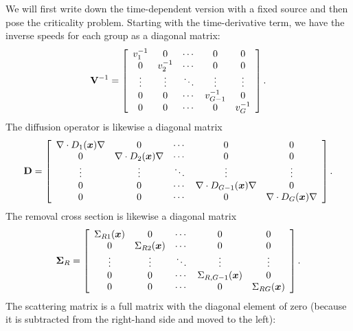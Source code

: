 We will first write down the time-dependent version with a fixed source and then pose the criticality problem. Starting with the time-derivative term, we have the inverse speeds for each group as a diagonal matrix:
\begin{align}
  \mathbf{V}^{-1} = \left[ \begin{array}{c c c c c}
  v_1^{-1} 	& 0			& \cdots	& 0				& 0			\\
  0			& v_2^{-1}	& \cdots	& 0				& 0			\\
  \vdots	& \vdots	& \ddots	& \vdots		& \vdots	\\
  0			& 0			& \cdots	& v_{G-1}^{-1}	& 0			\\
  0			& 0			& \cdots	& 0				& v_G^{-1}	\\ \end{array} \right] .
\end{align}
The diffusion operator is likewise a diagonal matrix
\begin{align}
  \mathbf{D} = \left[ \begin{array}{c c c c c}
  \nabla \cdot D_1(\bm{x}) \nabla 	& 0								& \cdots	& 0				& 0			\\
  0									& \nabla \cdot D_2(\bm{x}) \nabla & \cdots	& 0				& 0			\\
  \vdots							& \vdots						& \ddots	& \vdots		& \vdots	\\
  0									& 0								& \cdots	& \nabla \cdot D_{G-1}(\bm{x}) \nabla 	& 0			\\
  0									& 0								& \cdots	& 0				& \nabla \cdot D_G(\bm{x}) \nabla 	\\ \end{array} \right] .
\end{align}
The removal cross section is likewise a diagonal matrix
\begin{align}
  \boldsymbol\Sigma_R = \left[ \begin{array}{c c c c c}
  \Sigma_{R1}(\bm{x}) 	& 0			& \cdots	& 0				& 0			\\
  0			& \Sigma_{R2}(\bm{x})	& \cdots	& 0				& 0			\\
  \vdots	& \vdots	& \ddots	& \vdots		& \vdots	\\
  0			& 0			& \cdots	& \Sigma_{R,G-1}(\bm{x})	& 0			\\
  0			& 0			& \cdots	& 0				& \Sigma_{RG}(\bm{x})	\\ \end{array} \right] .
\end{align}
The scattering matrix is a full matrix with the diagonal element of zero (because it is subtracted from the right-hand side and moved to the left):
